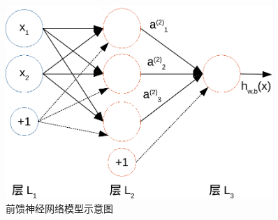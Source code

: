 \begin{figure}[h] %
	\centering
	\includegraphics[width=0.9\textwidth]{demo_images/illustration/network1.pdf}
	\caption{前馈神经网络模型示意图}
	\label{fig:lstm}
\end{figure}